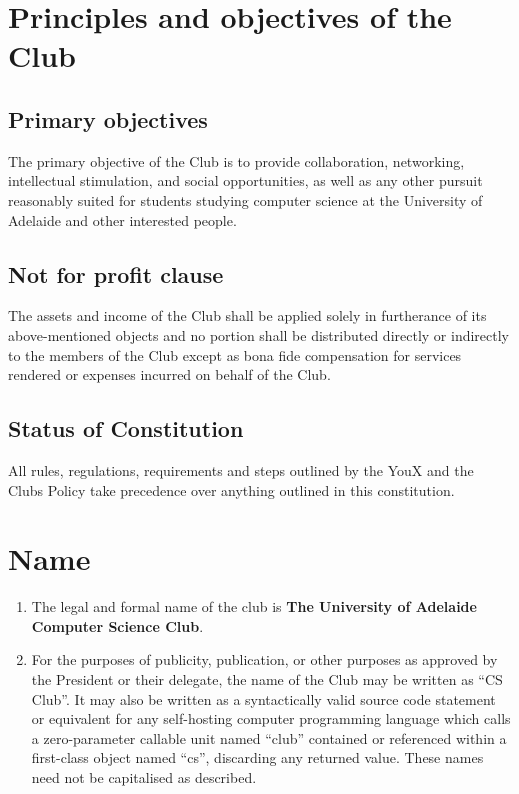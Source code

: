 \documentclass{constitution}
\begin{document}


\tableofcontents
\newpage



\section{Principles and objectives of the Club}\label{principlesObjectivesClub}

\subsection{Primary objectives}\label{primaryObjectivesClub}
The primary objective of the Club is to provide collaboration, networking, intellectual stimulation, and social opportunities, as well as any other pursuit reasonably suited for students studying computer science at the University of Adelaide and other interested people.

\subsection{Not for profit clause}\label{notForProfitClause}
The assets and income of the Club shall be applied solely in furtherance of its above-mentioned objects and no portion shall be distributed directly or indirectly to the members of the Club except as bona fide compensation for services rendered or expenses incurred on behalf of the Club.

\subsection{Status of Constitution}\label{statusConstitution}
All rules, regulations, requirements and steps outlined by the YouX and the Clubs Policy take precedence over anything outlined in this constitution.

\section{Name}\label{nameClub}
\begin{enumerate}[(1)]
    \item The legal and formal name of the club is \textbf{The University of Adelaide Computer Science Club}.
    \item For the purposes of publicity, publication, or other purposes as approved by the President or their delegate, the name of the Club may be written as ``CS Club''. It may also be written as a syntactically valid source code statement or equivalent for any self-hosting computer programming language which calls a zero-parameter callable unit named ``club'' contained or referenced within a first-class object named ``cs'', discarding any returned value. These names need not be capitalised as described.
\end{enumerate}
\end{document}
